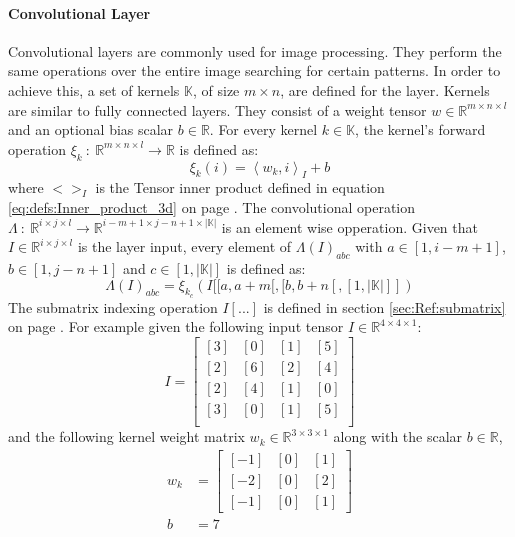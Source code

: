 \documentclass[12pt]{article}
\newcommand{\equationref}[1]{equation \ref{#1} on page \pageref{#1}}
\newcommand{\sectionref}[1]{section \ref{#1} on page \pageref{#1}}
\begin{document}
\paragraph{Convolutional Layer}
Convolutional layers are commonly used for image processing. They perform the same operations over the entire image searching for certain patterns. In order to achieve this, a set of kernels \(\mathbb{K}\), of size \(m\times n\), are defined for the layer. Kernels are similar to fully connected layers. They consist of a weight tensor \(w\in\mathbb{R}^{m \times n \times l}\) and an optional bias scalar \(b\in\mathbb{R}\). For every kernel \(k\in \mathbb{K}\), the kernel's forward operation \(\xi_k~:~\mathbb{R}^{m \times n \times l}\to\mathbb{R}\) is defined as:
\begin{equation}\label{eq:NN:kernelOpperation}
\xi_k(i) = \left<w_k, i\right>_I + b
\end{equation}
where \(<>_I\) is the Tensor inner product defined in \equationref{eq:defs:Inner_product_3d}.
The convolutional operation \(\Lambda~:~\mathbb{R}^{i\times j \times l}\to\mathbb{R}^{i-m+1 \times j-n+1 \times |\mathbb{K}|}\) is an element wise opperation. Given that  \(I \in \mathbb{R}^{i\times j\times l}\) is the layer input, every element of \(\Lambda(I)_{abc}\) with \(a \in [1, i-m+1]\), \(b \in [1, j-n+1]\) and \(c \in [1, |\mathbb{K}|]\) is defined as:
\begin{equation}\label{eq:NN:convolutional_opperation}
\Lambda(I)_{abc} = \xi_{k_c}(I[[a, a+m[,[b, b+n[,[1,|\mathbb{K}|]])
\end{equation}
The submatrix indexing operation \(I[...]\) is defined in \sectionref{sec:Ref:submatrix}.
For example given the following input tensor \(I \in\mathbb{R}^{4\times4\times1}\): %
\[
I = \left[
\begin{matrix}
[3] & [0] & [1] & [5] \\
[2] & [6] & [2] & [4] \\
[2] & [4] & [1] & [0] \\
[3] & [0] & [1] & [5] \\
\end{matrix}
\right]
\]
and the following kernel weight matrix \(w_k \in \mathbb{R}^{3 \times 3 \times 1}\) along with the scalar \(b\in \mathbb{R}\),
\begin{align*}
w_k &= \left[
\begin{matrix}
[-1] & [0] & [1] \\ 
[-2] & [0] & [2] \\
[-1] & [0] & [1]
\end{matrix}
\right]\\
b &=7\\
\end{align*}
\end{document}
